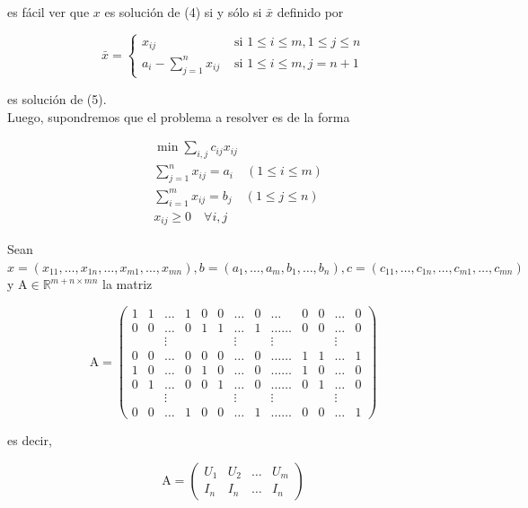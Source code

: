 \documentclass[10pt]{article}
\begin{document}
es fácil ver que $x$ es solución de (4) si y sólo si $\bar{x}$ definido por

$$
\bar{x}= \begin{cases}x_{i j} & \text { si } 1 \leq i \leq m, 1 \leq j \leq n \\ a_{i}-\sum_{j=1}^{n} x_{i j} & \text { si } 1 \leq i \leq m, j=n+1\end{cases}
$$

es solución de (5).\\
Luego, supondremos que el problema a resolver es de la forma


\begin{align*}
& \min \sum_{i, j} c_{i j} x_{i j} \\
& \sum_{j=1}^{n} x_{i j}=a_{i} \quad(1 \leq i \leq m)  \tag{P}\\
& \sum_{i=1}^{m} x_{i j}=b_{j} \quad(1 \leq j \leq n) \\
& x_{i j} \geq 0 \quad \forall i, j
\end{align*}


Sean $x=\left(x_{11}, \ldots, x_{1 n}, \ldots, x_{m 1}, \ldots, x_{m n}\right), b=\left(a_{1}, \ldots, a_{m}, b_{1}, \ldots, b_{n}\right), c=\left(c_{11}, \ldots, c_{1 n}, \ldots, c_{m 1}, \ldots, c_{m n}\right)$ y $\mathrm{A} \in \mathbb{R}^{m+n \times m n}$ la matriz

$$
\mathrm{A}=\left(\begin{array}{ccccccccccccc}
1 & 1 & \ldots & 1 & 0 & 0 & \ldots & 0 & \ldots & 0 & 0 & \ldots & 0 \\
0 & 0 & \ldots & 0 & 1 & 1 & \ldots & 1 & \ldots \ldots & 0 & 0 & \ldots & 0 \\
& & \vdots & & & & \vdots & & \vdots & & & \vdots & \\
0 & 0 & \ldots & 0 & 0 & 0 & \ldots & 0 & \ldots \ldots & 1 & 1 & \ldots & 1 \\
1 & 0 & \ldots & 0 & 1 & 0 & \ldots & 0 & \ldots \ldots & 1 & 0 & \ldots & 0 \\
0 & 1 & \ldots & 0 & 0 & 1 & \ldots & 0 & \ldots \ldots & 0 & 1 & \ldots & 0 \\
& & \vdots & & & & \vdots & & \vdots & & & \vdots & \\
0 & 0 & \ldots & 1 & 0 & 0 & \ldots & 1 & \ldots \ldots & 0 & 0 & \ldots & 1
\end{array}\right)
$$

es decir,

$$
\mathrm{A}=\left(\begin{array}{cccc}
U_{1} & U_{2} & \ldots & U_{m} \\
I_{n} & I_{n} & \ldots & I_{n}
\end{array}\right)
$$
\end{document}
